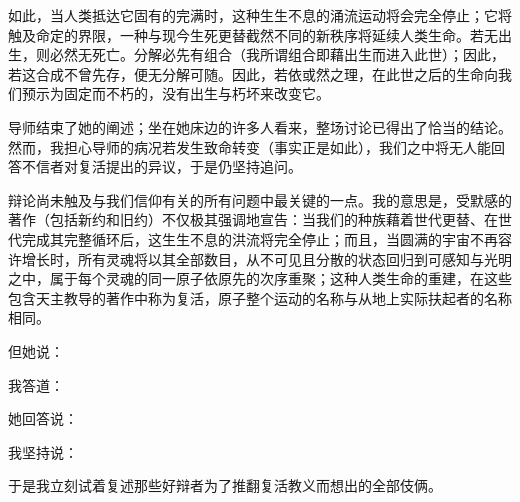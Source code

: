 如此，当人类抵达它固有的完满时，这种生生不息的涌流运动将会完全停止；它将触及命定的界限，一种与现今生死更替截然不同的新秩序将延续人类生命。若无出生，则必然无死亡。分解必先有组合（我所谓组合即藉出生而进入此世）；因此，若这合成不曾先存，便无分解可随。因此，若依或然之理，在此世之后的生命向我们预示为固定而不朽的，没有出生与朽坏来改变它。\par

导师结束了她的阐述；坐在她床边的许多人看来，整场讨论已得出了恰当的结论。然而，我担心导师的病况若发生致命转变（事实正是如此），我们之中将无人能回答不信者对复活提出的异议，于是仍坚持追问。\par

辩论尚未触及与我们信仰有关的所有问题中最关键的一点。我的意思是，受默感的著作（包括新约和旧约）不仅极其强调地宣告：当我们的种族藉着世代更替、在世代完成其完整循环后，这生生不息的洪流将完全停止；而且，当圆满的宇宙不再容许增长时，所有灵魂将以其全部数目，从不可见且分散的状态回归到可感知与光明之中，属于每个灵魂的同一原子依原先的次序重聚；这种人类生命的重建，在这些包含天主教导的著作中称为复活，原子整个运动的名称与从地上实际扶起者的名称相同。\par

但她说：\par

我答道：\par

她回答说：\par

我坚持说：\par

于是我立刻试着复述那些好辩者为了推翻复活教义而想出的全部伎俩。\par

